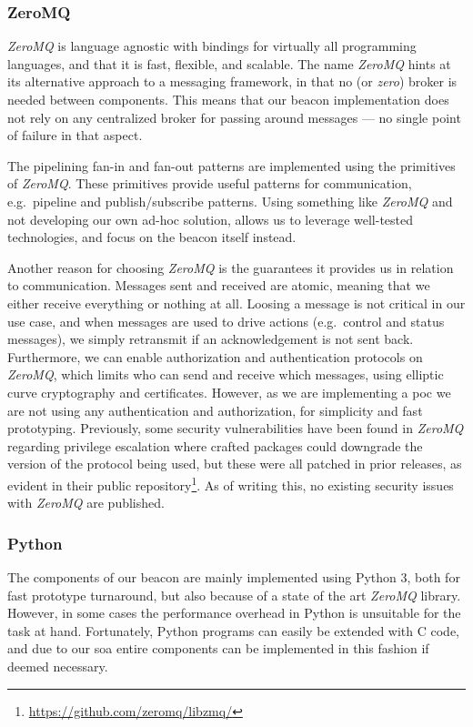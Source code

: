 \subsubsection{ZeroMQ}
\textit{ZeroMQ} is language agnostic with bindings for virtually all programming languages, and that it is fast, flexible, and scalable.
The name \textit{ZeroMQ} hints at its alternative approach to a messaging framework, in that no (or \textit{zero}) broker is needed between components.
This means that our beacon implementation does not rely on any centralized broker for passing around messages --- no single point of failure in that aspect.

The pipelining fan-in and fan-out patterns are implemented using the primitives of \textit{ZeroMQ}.
These primitives provide useful patterns for communication, e.g.\ pipeline and publish/subscribe patterns.
Using something like \textit{ZeroMQ} and not developing our own ad-hoc solution, allows us to leverage well-tested technologies, and focus on the beacon itself instead.

Another reason for choosing \textit{ZeroMQ} is the guarantees it provides us in relation to communication.
Messages sent and received are atomic, meaning that we either receive everything or nothing at all.
Loosing a message is not critical in our use case, and when messages are used to drive actions (e.g.\ control and status messages), we simply retransmit if an acknowledgement is not sent back.
Furthermore, we can enable authorization and authentication protocols on \textit{ZeroMQ}, which limits who can send and receive which messages, using elliptic curve cryptography and certificates.
However, as we are implementing a \gls{poc} we are not using any authentication and authorization, for simplicity and fast prototyping.
Previously, some security vulnerabilities have been found in \textit{ZeroMQ} regarding privilege escalation where crafted packages could downgrade the version of the protocol being used, but these were all patched in prior releases, as evident in their public repository\footnote{\url{https://github.com/zeromq/libzmq/}}.
As of writing this, no existing security issues with \textit{ZeroMQ} are published.

\subsubsection{Python}
The components of our beacon are mainly implemented using Python 3, both for fast prototype turnaround, but also because of a state of the art \textit{ZeroMQ} library.
However, in some cases the performance overhead in Python is unsuitable for the task at hand.
Fortunately, Python programs can easily be extended with C code, and due to our \gls{soa} entire components can be implemented in this fashion if deemed necessary.
